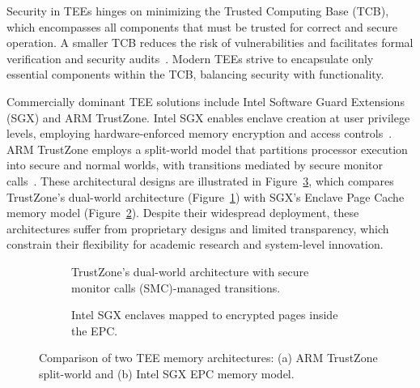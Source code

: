 Security in TEEs hinges on minimizing the Trusted Computing Base (TCB), which encompasses all components that must be trusted for correct and secure operation. A smaller TCB reduces the risk of vulnerabilities and facilitates formal verification and security audits~\cite{Lee2019,Survey2023}. Modern TEEs strive to encapsulate only essential components within the TCB, balancing security with functionality.

Commercially dominant TEE solutions include Intel Software Guard Extensions (SGX) and ARM TrustZone. Intel SGX enables enclave creation at user privilege levels, employing hardware-enforced memory encryption and access controls~\cite{costan2016intel}. ARM TrustZone employs a split-world model that partitions processor execution into secure and normal worlds, with transitions mediated by secure monitor calls~\cite{yan2018trustzone}. These architectural designs are illustrated in Figure~\ref{fig:tee-architectures}, which compares TrustZone's dual-world architecture (Figure~\ref{fig:trustzone}) with SGX's Enclave Page Cache memory model (Figure~\ref{fig:sgx-epc}). Despite their widespread deployment, these architectures suffer from proprietary designs and limited transparency, which constrain their flexibility for academic research and system-level innovation.

\begin{figure}[htbp]
\centering
\begin{subfigure}[b]{0.48\linewidth}
  \centering
  \caption{TrustZone's dual-world architecture with secure monitor calls (SMC)-managed transitions.}
  \label{fig:trustzone}
\end{subfigure}
\hfill
\begin{subfigure}[b]{0.48\linewidth}
  \centering
  \caption{Intel SGX enclaves mapped to encrypted pages inside the EPC.}
  \label{fig:sgx-epc}
\end{subfigure}
\caption{Comparison of two TEE memory architectures: (a) ARM TrustZone split-world and (b) Intel SGX EPC memory model.}
\label{fig:tee-architectures}
\end{figure}

